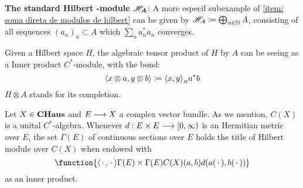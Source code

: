 \begin{exemplos}
\begin{itroman}
    \item \textbf{The standard Hilbert -module $\boldsymbol{\mathscr H_A}$}: A more especif subexample of \ref{item: soma direta de modulos de hilbert} can be given by $\mathscr H_A \coloneqq \bigoplus_{n\in \mathbb N} A$, consisting of all sequences $(a_n)_n \subset A$ which $\sum_n a_n^*a_n$ converges.
    \item \label{exemplo hilb (X) C*algebra} Given a Hilbert space $H$, the algebraic tensor product of $H$ by $A$ can be seeing as a Inner product $C^*$-module, with the bond:
    \[
    \inner {x\otimes a}{y\otimes b} \coloneqq \sub{\inner xy}H a^*b
    \]
    $H\otimes A$ stands for its completion.
    
    \item Let $X \in \boldsymbol{\operatorname{CHaus}}$ and $E\longrightarrow X$ a complex vector bundle. As we mention, $C(X)$ is a unital $C^*$-algebra. Whenever $d: E\times E \longrightarrow [0,\infty)$ is an Hermitian metric over $E$, the set $\Gamma (E)$ of continuous sections over $E$ holds the title of Hilbert module over $C(X)$ when endowed with
    \begin{equation*}
    \function{{\inner\come\come}{\Gamma(E)\times \Gamma(E)}{C(X)}{(a,b)}{d(a(\,\cdot\,),b(\,\cdot\,))}} 
    \end{equation*}
    as an inner product.
\end{itroman}
\end{exemplos}
%

